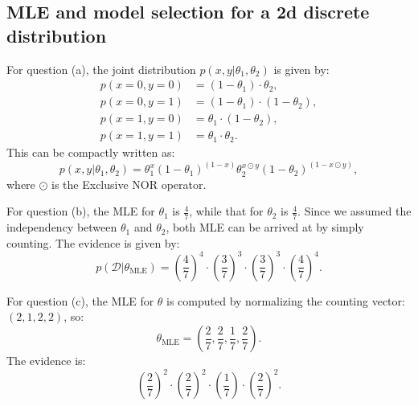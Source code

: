 \documentclass[UTF8]{ctexart}
\begin{document}
\subsection{MLE and model selection for a 2d discrete distribution}
For question (a), the joint distribution $p(x,y|\theta_{1},\theta_{2})$ is given by:
$$
\begin{aligned}
p(x=0,y=0)&=(1-\theta_{1})\cdot \theta_{2},\\
p(x=0,y=1)&=(1-\theta_{1})\cdot (1-\theta_{2}),\\
p(x=1,y=0)&=\theta_{1}\cdot (1-\theta_{2}),\\
p(x=1,y=1)&=\theta_{1}\cdot \theta_{2}.
\end{aligned}
$$
This can be compactly written as:
$$p(x,y|\theta_{1},\theta_{2})=\theta_{1}^{x}(1-\theta_{1})^{(1-x)}\theta_{2}^{x\odot y}(1-\theta_{2})^{(1-x\odot y)},$$
where $\odot$ is the Exclusive NOR operator.

For question (b), the MLE for $\theta_{1}$ is $\frac{4}{7}$, while that for $\theta_{2}$ is $\frac{4}{7}$.
Since we assumed the independency between $\theta_{1}$ and $\theta_{2}$, both MLE can be arrived at by simply counting.
The evidence is given by:
$$p(\mathcal{D}|\theta_{\text{MLE}})=\left(\frac{4}{7} \right)^{4}\cdot \left(\frac{3}{7} \right)^{3}\cdot \left(\frac{3}{7} \right)^{3} \cdot \left(\frac{4}{7} \right)^{4}.$$

For question (c), the MLE for $\theta$ is computed by normalizing the counting vector: $(2,1,2,2)$, so:
$$\theta_{\text{MLE}}=\left(\frac{2}{7},\frac{2}{7},\frac{1}{7},\frac{2}{7}\right).$$
The evidence is:
$$\left(\frac{2}{7} \right)^{2}\cdot \left(\frac{2}{7} \right)^{2}\cdot \left(\frac{1}{7} \right)\cdot \left(\frac{2}{7} \right)^{2}. $$
\end{document}
